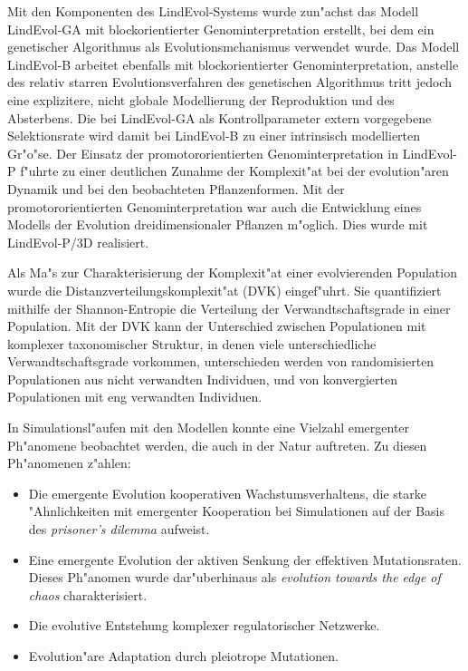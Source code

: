 Mit den Komponenten des LindEvol-Systems wurde zun"achst das Modell LindEvol-GA mit blockorientierter
Genominterpretation erstellt, bei dem ein genetischer Algorithmus als Evolutionsmchanismus verwendet wurde. 
Das Modell LindEvol-B arbeitet ebenfalls mit blockorientierter Genominterpretation, anstelle des relativ
starren Evolutionsverfahren des genetischen Algorithmus tritt jedoch eine
explizitere, nicht globale Modellierung der Reproduktion und des Absterbens. Die bei LindEvol-GA
als Kontrollparameter extern vorgegebene Selektionsrate wird damit bei LindEvol-B zu einer intrinsisch modellierten
Gr"o"se. Der Einsatz der promotororientierten Genominterpretation in LindEvol-P f"uhrte zu einer
deutlichen Zunahme der Komplexit"at bei der evolution"aren Dynamik und bei den beobachteten
Pflanzenformen. Mit der promotororientierten Genominterpretation war auch die Entwicklung eines
Modells der Evolution dreidimensionaler Pflanzen m"oglich. Dies wurde mit LindEvol-P/3D realisiert.

Als Ma"s zur Charakterisierung der Komplexit"at einer evolvierenden Population wurde die
Distanzverteilungskomplexit"at (DVK) eingef"uhrt. Sie quantifiziert mithilfe der Shannon-Entropie
die Verteilung der Verwandtschaftsgrade in einer Population. Mit der DVK kann der Unterschied
zwischen Populationen mit komplexer taxonomischer Struktur, in denen viele unterschiedliche
Verwandtschaftsgrade vorkommen, unterschieden werden von randomisierten Populationen aus
nicht verwandten Individuen, und von konvergierten Populationen mit eng verwandten Individuen.

In Simulationsl"aufen mit den Modellen konnte eine Vielzahl emergenter Ph"anomene beobachtet
werden, die auch in der Natur auftreten. Zu diesen Ph"anomenen z"ahlen:

\begin{itemize}

\item Die emergente Evolution kooperativen Wachstumsverhaltens, die starke "Ahnlichkeiten mit emergenter Kooperation bei
Simulationen auf der Basis des \textsl{prisoner's dilemma} aufweist.

\item Eine emergente Evolution der aktiven Senkung der effektiven Mutationsraten. Dieses Ph"anomen
wurde dar"uberhinaus als \textsl{evolution towards the edge of chaos} charakterisiert.

\item Die evolutive Entstehung komplexer regulatorischer Netzwerke.

\item Evolution"are Adaptation durch pleiotrope Mutationen. 

\end{itemize}

